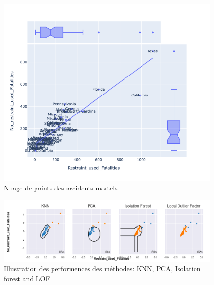 
 \begin{figure}[H]
    \centering
    \includegraphics[width=.50\textwidth]{ADOA/Images/Fatal1.png}
    \caption{Nuage de points des accidents mortels}%
    \label{fig2a}
\end{figure}

 \begin{figure}[ht]
    \centering
    \includegraphics[width=1\textwidth]{ADOA/Images/Fatal11.png}
    \caption{Illustration des performences des méthodes: KNN, PCA, Isolation forest and LOF}%
    \label{fig3}
\end{figure}
\vspace{2cm}

